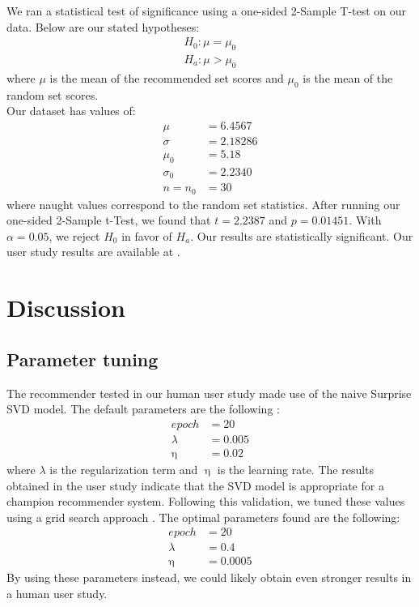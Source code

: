 \documentclass [11pt]{IEEEtran}
\begin{document}
\newpage
\noindent We ran a statistical test of significance using a one-sided 2-Sample T-test on our data. Below are our stated hypotheses:  
\begin{align*}
H_0: \mu = \mu_{0} \\
H_a: \mu > \mu_{0} 
\end{align*}
where $\mu$ is the mean of the recommended set scores and $\mu_{0}$ is the mean of the random set scores. \\
Our dataset has values of: 
\begin{align*}
\mu& = 6.4567 \\
\sigma& = 2.18286 \\
\mu_{0}& = 5.18 \\
\sigma_{0}& = 2.2340 \\
n = n_{0}& = 30
\end{align*}
where naught values correspond to the random set statistics.
After running our one-sided 2-Sample t-Test, we found that $t=2.2387$ and $p=0.01451$. With $ \alpha = 0.05$, we reject $H_0$ in favor of $H_a$. Our results are statistically significant. Our user study results are available at \cite{github}. 
\section{Discussion}
\subsection{Parameter tuning}
The recommender tested in our human user study made use of the naive Surprise SVD model. The default parameters are the following \cite{Surprise}: 
\begin{align*}
    epoch& = 20 \\
    \lambda&  = 0.005 \\
    \upeta& = 0.02
\end{align*}
where $\lambda$ is the regularization term and $\upeta$ is the learning rate. The results obtained in the user study indicate that the SVD model is appropriate for a champion recommender system. Following this validation, we tuned these values using a grid search approach \cite{Surprise}. The optimal parameters found are the following:
\begin{align*}
    epoch& = 20 \\
    \lambda& = 0.4 \\
    \upeta& = 0.0005
\end{align*}
By using these parameters instead, we could likely obtain even stronger results in a human user study. 
\end{document}

